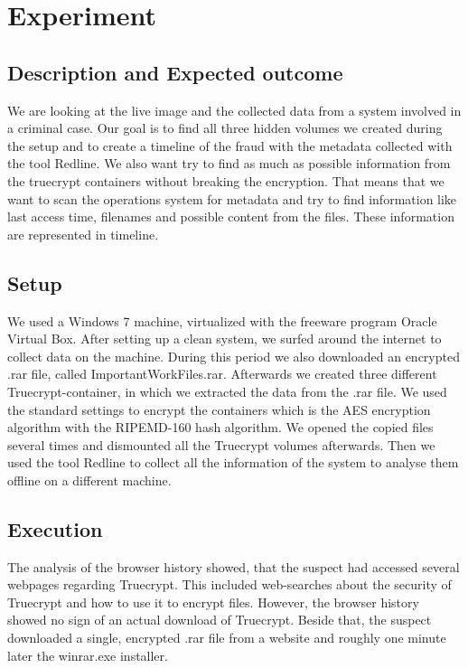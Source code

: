 \section{Experiment}
\subsection{Description and Expected outcome}
We are looking at the live image and the collected data from a system involved in a criminal case. Our goal is to find all three hidden volumes we created during the setup and to create a timeline of the fraud with the metadata collected with the tool Redline. 
We also want try to find as much as possible information from the truecrypt containers without breaking the encryption. That means that we want to scan the operations system for metadata and try to find information like last access time, filenames and possible content from the files. These information are represented in timeline.

\subsection{Setup}
We used a Windows 7 machine, virtualized with the freeware program Oracle Virtual Box. After setting up a clean system, we surfed around the internet to collect data on the machine. During this period we also downloaded an encrypted .rar file, called ImportantWorkFiles.rar. Afterwards we created three different Truecrypt-container, in which we extracted the data from the .rar file.
We used the standard settings to encrypt the containers which is the AES encryption algorithm with the RIPEMD-160 hash algorithm.
We opened the copied files several times and dismounted all the Truecrypt volumes afterwards.
Then we used the tool Redline to collect all the information of the system to analyse them offline on a different
machine.
\subsection{Execution}
The analysis of the browser history showed, that the suspect had accessed several webpages regarding Truecrypt. This included web-searches about the security of Truecrypt and how to use it to encrypt files. However, the browser history showed no sign of an actual download of Truecrypt. Beside that, the suspect downloaded a single, encrypted .rar file from a website and roughly one minute later the winrar.exe installer.

